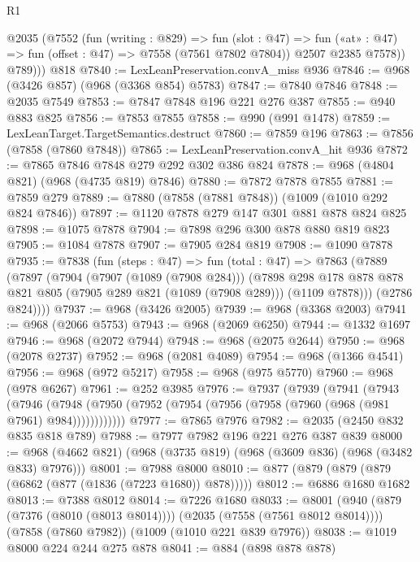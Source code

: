 \begin{lexlean}{R1}
\begin{coremodule}
        @2035
          (@7552
            (fun (writing : @829) =>
            fun (slot : @47) => fun («at» : @47) => fun (offset : @47) => @7558 (@7561 @7802 @7804))
            @2507
            @2385
            @7578))
          @789)))
    @818
@7840 := LexLeanPreservation.convA_miss @936
@7846 := @968 (@3426 @857) (@968 (@3368 @854) @5783)
@7847 := @7840 @7846
@7848 := @2035 @7549
@7853 := @7847 @7848 @196 @221 @276 @387
@7855 := @940 @883 @825
@7856 := @7853 @7855
@7858 := @990 (@991 @1478)
@7859 := LexLeanTarget.TargetSemantics.destruct
@7860 := @7859 @196
@7863 := @7856 (@7858 (@7860 @7848))
@7865 := LexLeanPreservation.convA_hit @936
@7872 := @7865 @7846 @7848 @279 @292 @302 @386 @824
@7878 := @968 (@4804 @821) (@968 (@4735 @819) @7846)
@7880 := @7872 @7878 @7855
@7881 := @7859 @279
@7889 := @7880 (@7858 (@7881 @7848)) (@1009 (@1010 @292 @824 @7846))
@7897 := @1120 @7878 @279 @147 @301 @881 @878 @824 @825
@7898 := @1075 @7878
@7904 := @7898 @296 @300 @878 @880 @819 @823
@7905 := @1084 @7878
@7907 := @7905 @284 @819
@7908 := @1090 @7878
@7935 := @7838
    (fun (steps : @47) =>
    fun (total : @47) =>
    @7863
      (@7889
        (@7897
          (@7904
            (@7907 (@1089 (@7908 @284)))
            (@7898
              @298
              @178
              @878
              @878
              @821
              @805
              (@7905 @289 @821 (@1089 (@7908 @289)))
              (@1109 @7878)))
          (@2786 @824))))
@7937 := @968 (@3426 @2005)
@7939 := @968 (@3368 @2003)
@7941 := @968 (@2066 @5753)
@7943 := @968 (@2069 @6250)
@7944 := @1332 @1697
@7946 := @968 (@2072 @7944)
@7948 := @968 (@2075 @2644)
@7950 := @968 (@2078 @2737)
@7952 := @968 (@2081 @4089)
@7954 := @968 (@1366 @4541)
@7956 := @968 (@972 @5217)
@7958 := @968 (@975 @5770)
@7960 := @968 (@978 @6267)
@7961 := @252 @3985
@7976 := @7937
    (@7939
      (@7941
        (@7943
          (@7946
            (@7948 (@7950 (@7952 (@7954 (@7956 (@7958 (@7960 (@968 (@981 @7961) @984))))))))))))
@7977 := @7865 @7976
@7982 := @2035 (@2450 @832 @835 @818 @789)
@7988 := @7977 @7982 @196 @221 @276 @387 @839
@8000 := @968 (@4662 @821) (@968 (@3735 @819) (@968 (@3609 @836) (@968 (@3482 @833) @7976)))
@8001 := @7988 @8000
@8010 := @877 (@879 (@879 (@879 (@6862 (@877 (@1836 (@7223 @1680)) @878)))))
@8012 := @6886 @1680 @1682
@8013 := @7388 @8012
@8014 := @7226 @1680
@8033 := @8001
    (@940 (@879 (@7376 (@8010 (@8013 @8014)))) (@2035 (@7558 (@7561 @8012 @8014))))
    (@7858 (@7860 @7982))
    (@1009 (@1010 @221 @839 @7976))
@8038 := @1019 @8000 @224 @244 @275 @878
@8041 := @884 (@898 @878 @878)

\end{coremodule}
\end{lexlean}
